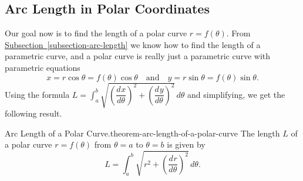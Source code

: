 \documentclass[10pt,]{book}
\numberwithin{equation}{section}
\newcommand{\dv}[3][]{\dfrac{d^{#1} #2}{d #3^{#1}}}
\begin{document}
\subsection[{Arc Length in Polar Coordinates}]{Arc Length in Polar Coordinates}\label{subsection-arc-length-in-polar-coordinates}
\hypertarget{p-1055}{}%
Our goal now is to find the length of a polar curve \(r=f(\theta)\). From \hyperref[subsection-arc-length]{Subsection~\ref{subsection-arc-length}} we know how to find the length of a parametric curve, and a polar curve is really just a parametric curve with parametric equations%
%
\begin{equation*}
x = r\cos\theta = f(\theta)\cos\theta \quad\text{and}\quad y = r\sin\theta = f(\theta)\sin\theta.
\end{equation*}
\hypertarget{p-1056}{}%
Using the formula \(L = \int_{a}^{b}\sqrt{(\dv{x}{\theta})^{2}+(\dv{y}{\theta})^{2}}\,d\theta\) and simplifying, we get the following result.%
\begin{theorem}{Arc Length of a Polar Curve.}{}{theorem-arc-length-of-a-polar-curve}%
\hypertarget{p-1057}{}%
The length \(L\) of a polar curve \(r = f(\theta)\) from \(\theta=a\) to \(\theta=b\) is given by%
\begin{equation*}
L = \int_{a}^{b}\sqrt{r^{2} + \left(\dv{r}{\theta}\right)^{2}}\,d\theta.
\end{equation*}
%
\end{theorem}
\end{document}
